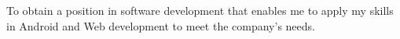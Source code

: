 
To obtain a position in software development that enables me to apply my skills in Android and Web development to meet the company's needs.

